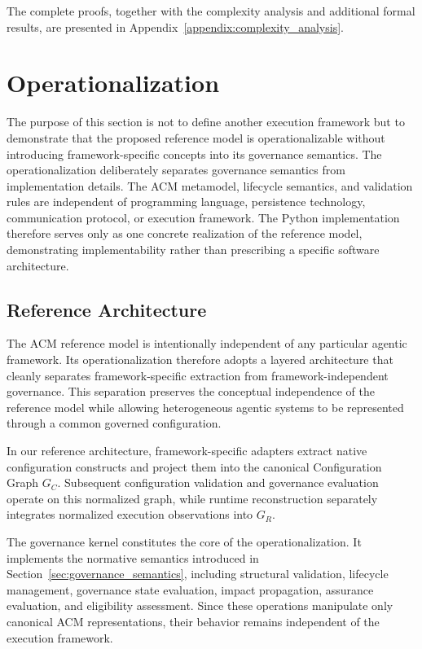 \documentclass[10pt]{article}
\begin{document}
The complete proofs, together with the complexity analysis and additional formal results, are presented in Appendix~\ref{appendix:complexity_analysis}.

\section{Operationalization}
\label{sec:operationalization}

The purpose of this section is not to define another execution framework but to demonstrate that the proposed reference model is operationalizable without introducing framework-specific concepts into its governance semantics. The operationalization deliberately separates governance semantics from implementation details. The ACM metamodel, lifecycle semantics, and validation rules are independent of programming language, persistence technology, communication protocol, or execution framework. The Python implementation therefore serves only as one concrete realization of the reference model, demonstrating implementability rather than prescribing a specific software architecture.

\subsection{Reference Architecture}
\label{subsec:reference_architecture}

The ACM reference model is intentionally independent of any particular agentic framework. Its operationalization therefore adopts a layered architecture that cleanly separates framework-specific extraction from framework-independent governance. This separation preserves the conceptual independence of the reference model while allowing heterogeneous agentic systems to be represented through a common governed configuration.

In our reference architecture, framework-specific adapters extract native
configuration constructs and project them into the canonical Configuration
Graph $G_C$. Subsequent configuration validation and governance evaluation
operate on this normalized graph, while runtime reconstruction separately
integrates normalized execution observations into $G_R$.

The governance kernel constitutes the core of the operationalization. It implements the normative semantics introduced in Section~\ref{sec:governance_semantics}, including structural validation, lifecycle management, governance state evaluation, impact propagation, assurance evaluation, and eligibility assessment. Since these operations manipulate only canonical ACM representations, their behavior remains independent of the execution framework.
\end{document}
